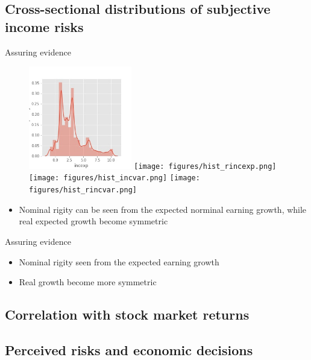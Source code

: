 \documentclass{beamer}
\begin{document}
\subsection{Cross-sectional distributions of subjective income risks}

\begin{frame}{Assuring evidence}
		\begin{figure}
		\centering
		\label{InfVar}
		\includegraphics[width=0.4\textwidth]{figures/hist_incexp}
		\texttt{[image: figures/hist\_rincexp.png]} \\
		\vspace 
		\texttt{[image: figures/hist\_incvar.png]}
		\texttt{[image: figures/hist\_rincvar.png]}
	\end{figure}
	\begin{itemize}
		\item Nominal rigity can be seen from the expected norminal earning growth, while real expected growth become symmetric 
	\end{itemize}
\end{frame}


\begin{frame}{Assuring evidence}
	\begin{itemize}
		\item Nominal rigity seen from the expected earning growth
		\item Real growth become more symmetric 
	\end{itemize}
\end{frame}


\subsection{Correlation with stock market returns}

\subsection{Perceived risks and economic decisions}
\end{document}
